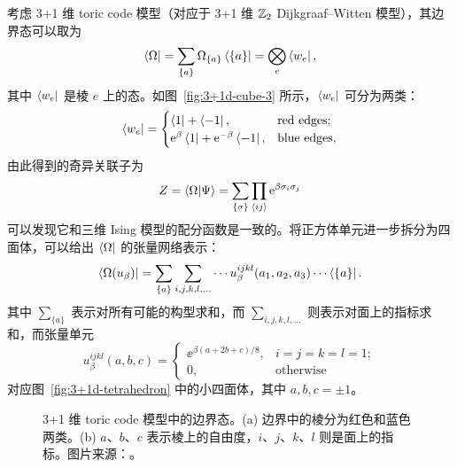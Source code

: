 考虑 3+1 维 toric code 模型（对应于 3+1 维 $\mathbb{Z}_2$ Dijkgraaf--Witten 模型）\cite{hamma2005string,zhao2022string}，其边界态可以取为
\begin{equation}
  \bra{\Omega} = \sum_{\{a\}} \Omega_{\{a\}} \bra{\{a\}} = \bigotimes_e \bra{w_e},
\end{equation}
其中 $\bra{w_e}$ 是棱 $e$ 上的态。如图~\ref{fig:3+1d-cube-3} 所示，$\bra{w_e}$ 可分为两类：
\begin{equation}
  \bra{w_e} = \begin{cases}
    \bra{1} + \bra{-1}, & \text{red edges}; \\
    \ee^\beta \bra{1} + \ee^{-\beta} \bra{-1}, & \text{blue edges},
  \end{cases}
\end{equation}
由此得到的奇异关联子为
\begin{equation}
  Z = \langle\Omega|\Psi\rangle = \sum_{\{\sigma\}} \prod_{\ev{ij}} \ee^{\beta \sigma_i \sigma_j}
\end{equation}
可以发现它和三维 Ising 模型的配分函数是一致的。将正方体单元进一步拆分为四面体，可以给出 $\bra{\Omega}$ 的张量网络表示：
\begin{equation}
  \bra{\Omega(u_\beta)} = \sum_{\{a\}} \sum_{i,j,k,l,\dots} \cdots u_\beta^{ijkl} (a_1,a_2,a_3) \cdots \bra{\{a\}}.
\end{equation}
其中 $\sum_{\{a\}}$ 表示对所有可能的构型求和，而 $\sum_{i,j,k,l,\dots}$ 则表示对面上的指标求和，而张量单元
\begin{equation}
  u_\beta^{ijkl} (a,b,c) = \begin{cases}
    \ee^{\beta(a+2b+c)/8}, & i=j=k=l=1; \\
    0, & \text{otherwise}
  \end{cases}
\end{equation}
对应图~\ref{fig:3+1d-tetrahedron} 中的小四面体，其中 $a,b,c=\pm1$。

\begin{figure}[htb]
  \centering
   \qquad
  \caption[3+1 维 toric code 模型中的边界态]{3+1 维 toric code 模型中的边界态。(a) 边界中的棱分为红色和蓝色两类。(b) $a$、$b$、$c$ 表示棱上的自由度，$i$、$j$、$k$、$l$ 则是面上的指标。图片来源：\parencite{chen2022exact}。}
\end{figure}

